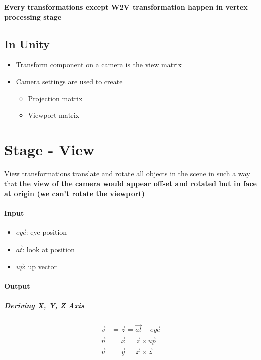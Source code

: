   \textbf{Every transformations except W2V transformation happen in vertex
  processing stage}

  \subsection{In Unity}

    \begin{itemize}
      \item Transform component on a camera is the view matrix
      \item Camera settings are used to create
      \begin{itemize}
        \item Projection matrix
        \item Viewport matrix
      \end{itemize}
    \end{itemize}

\section{Stage - View}

  View transformations translate and rotate all objects in the scene in such
  a way that \textbf{the view of the camera would appear offset and rotated but
  in face at origin (we can't rotate the viewport)}

  \paragraph{Input}
  \begin{itemize}
    \item $ \vec{eye} $: eye position
    \item $ \vec{at} $: look at position
    \item $ \vec{up} $: up vector
  \end{itemize}

  \paragraph{Output}
  \subparagraph{Deriving X, Y, Z Axis}
  \begin{align}
    \vec{v} &= \vec{z} = \vec{at} - \vec{eye} \\
    \vec{n} &= \vec{x} = \vec{z} \times \vec{up} \\
    \vec{u} &= \vec{y} = \vec{x} \times \vec{z}
  \end{align}

